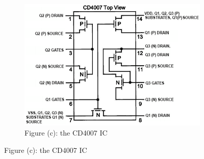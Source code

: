 \documentclass{article}
\begin{document}
\begin{CJK*}{UTF8}{bkai}
\begin{figure}[h]
    \begin{center}
        \begin{subfigure}[b]{0.45\textwidth}
            \includegraphics[width=\textwidth]{CD4007_IC.png}
            \caption*{Figure (c): the CD4007 IC}
        \end{subfigure}
    \end{center}
\end{figure}
    
\end{CJK*}
\end{document}
